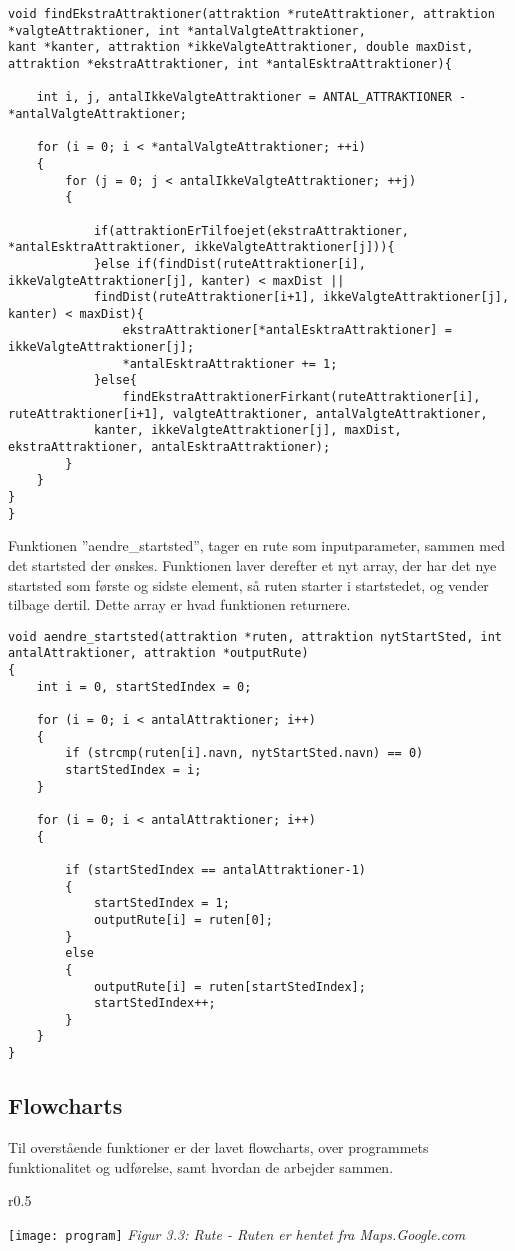 \begin{lstlisting}
void findEkstraAttraktioner(attraktion *ruteAttraktioner, attraktion *valgteAttraktioner, int *antalValgteAttraktioner, 
kant *kanter, attraktion *ikkeValgteAttraktioner, double maxDist, attraktion *ekstraAttraktioner, int *antalEsktraAttraktioner){
	
	int i, j, antalIkkeValgteAttraktioner = ANTAL_ATTRAKTIONER - *antalValgteAttraktioner;
	
	for (i = 0; i < *antalValgteAttraktioner; ++i)
	{
		for (j = 0; j < antalIkkeValgteAttraktioner; ++j)
		{
			
			if(attraktionErTilfoejet(ekstraAttraktioner, *antalEsktraAttraktioner, ikkeValgteAttraktioner[j])){
			}else if(findDist(ruteAttraktioner[i], ikkeValgteAttraktioner[j], kanter) < maxDist || 
			findDist(ruteAttraktioner[i+1], ikkeValgteAttraktioner[j], kanter) < maxDist){
				ekstraAttraktioner[*antalEsktraAttraktioner] = ikkeValgteAttraktioner[j];
				*antalEsktraAttraktioner += 1;
			}else{
				findEkstraAttraktionerFirkant(ruteAttraktioner[i], ruteAttraktioner[i+1], valgteAttraktioner, antalValgteAttraktioner,
			kanter, ikkeValgteAttraktioner[j], maxDist, ekstraAttraktioner, antalEsktraAttraktioner);
		}
	}
}
}
\end{lstlisting}

Funktionen ”aendre\_startsted”, tager en rute som inputparameter, sammen med det startsted der ønskes. Funktionen laver derefter et nyt array, der har det nye startsted som første og sidste element, så ruten starter i startstedet, og vender tilbage dertil. Dette array er hvad funktionen returnere. 

\begin{lstlisting}
void aendre_startsted(attraktion *ruten, attraktion nytStartSted, int antalAttraktioner, attraktion *outputRute)
{
	int i = 0, startStedIndex = 0;
	
	for (i = 0; i < antalAttraktioner; i++)
	{
		if (strcmp(ruten[i].navn, nytStartSted.navn) == 0)
		startStedIndex = i;
	}
	
	for (i = 0; i < antalAttraktioner; i++)
	{
		
		if (startStedIndex == antalAttraktioner-1)
		{
			startStedIndex = 1;
			outputRute[i] = ruten[0];
		}
		else
		{
			outputRute[i] = ruten[startStedIndex];
			startStedIndex++;
		}
	}
}
\end{lstlisting}

\subsection{Flowcharts}
Til overstående funktioner er der lavet flowcharts, over programmets funktionalitet og udførelse, samt hvordan de arbejder sammen.\newline

\begin{wrapfigure}{r}{0.5\textwidth}
  \vspace{-50pt}
  \begin{center}
    \texttt{[image: program]}\newline
    \textit{Figur 3.3: Rute - Ruten er hentet fra Maps.Google.com}
  \end{center}
  \vspace{-10pt}
  \vspace{-10pt}
\end{wrapfigure}
